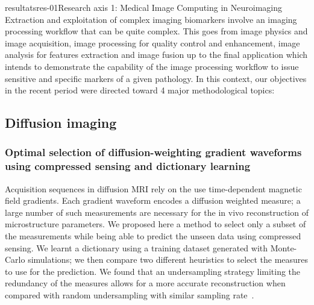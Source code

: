 \documentclass{ra2018}
\begin{document}
\begin{module}{resultats}{res-01}{Research axis 1: Medical Image Computing in Neuroimaging}
Extraction and exploitation of complex imaging biomarkers involve an imaging processing workflow that can be quite complex. This goes from image physics and image acquisition, image processing for quality control and enhancement, image analysis for features extraction and image fusion up to the final application which intends to demonstrate the capability of the image processing workflow to issue sensitive and specific markers of a given pathology. In this context, our objectives in the recent period were directed toward 4 major methodological topics:

\subsection{Diffusion imaging}

\subsubsection{Optimal selection of diffusion-weighting gradient waveforms using compressed sensing and dictionary learning}
\begin{participants}
\end{participants}
Acquisition sequences in diffusion MRI rely on the use time-dependent magnetic field gradients. Each gradient waveform encodes a diffusion weighted measure; a large number of such measurements are necessary for the in vivo reconstruction of microstructure parameters. We proposed here a method to select only a subset of the measurements while being able to predict the unseen data using compressed sensing. We learnt a dictionary using a training dataset generated with Monte-Carlo simulations; we then compare two different heuristics to select the measures to use for the prediction. We found that an undersampling strategy limiting the redundancy of the measures allows for a more accurate reconstruction when compared with random undersampling with similar sampling rate~\cite{truffet:inserm-01939066}.


\end{module}
\end{document}
